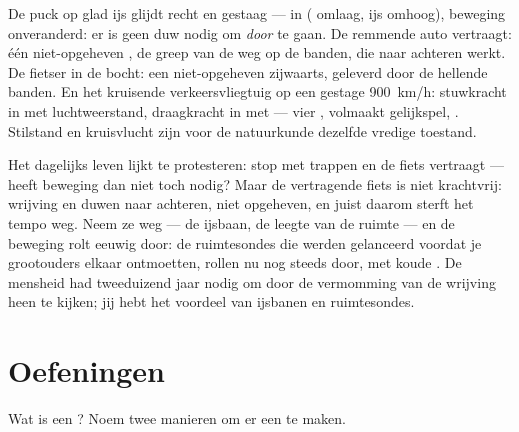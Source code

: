 \begin{example}\label{ex:g9:uniform-varied-motion:reading}
De puck op glad ijs glijdt recht en gestaag ---  in
 ( omlaag, ijs omhoog), beweging onveranderd: er
is geen duw nodig om \emph{door} te gaan. De remmende auto vertraagt:
één niet-opgeheven , de greep van de weg op de banden,
die naar achteren werkt. De fietser in de bocht: een niet-opgeheven
 zijwaarts, geleverd door de hellende banden. En het
kruisende verkeersvliegtuig op een gestage \qty{900}{km/h}: stuwkracht
in  met luchtweerstand, draagkracht in  met
 --- vier , volmaakt gelijkspel,
. Stilstand en kruisvlucht zijn voor de
natuurkunde dezelfde vredige toestand.
\end{example}

\begin{remark}\label{rem:g9:uniform-varied-motion:surprise}
Het dagelijks leven lijkt te protesteren: stop met trappen en de fiets
vertraagt --- heeft beweging dan niet toch  nodig? Maar
de vertragende fiets is niet krachtvrij: wrijving en  duwen
naar achteren, niet opgeheven, en juist daarom sterft het tempo weg.
Neem ze weg --- de ijsbaan, de leegte van de ruimte --- en de beweging
rolt eeuwig door: de ruimtesondes die werden gelanceerd voordat je
grootouders elkaar ontmoetten, rollen nu nog steeds door, met koude
. De mensheid had tweeduizend jaar nodig om door de vermomming
van de wrijving heen te kijken; jij hebt het voordeel van ijsbanen en
ruimtesondes.
\end{remark}

\section{Oefeningen}

\begin{exercise}[$\star$]\label{exo:g9:uniform-varied-motion:1}
Wat is een ? Noem twee manieren om er een
te maken.
\end{exercise}

